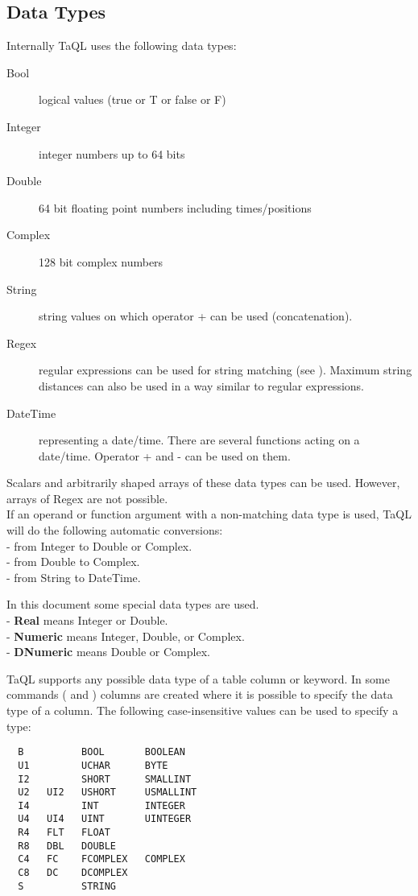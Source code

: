 \subsection{\label{TAQL:DATATYPES}Data Types}
Internally TaQL uses the following data types:
\begin{description}
  \item[Bool ] logical values (true or T or false or F)
  \item[Integer ] integer numbers up to 64 bits
  \item[Double ] 64 bit floating point numbers including times/positions
  \item[Complex ] 128 bit complex numbers
  \item[String ] string values on which operator + can be used (concatenation).
  \item[Regex ] regular expressions can be used for string
    matching (see ). Maximum string
    distances can also be used in a way similar to regular
    expressions. 
  \item[DateTime ] representing a date/time. There are several functions
       acting on a date/time. Operator + and - can be used on them.
\end{description}
Scalars and arbitrarily shaped arrays of these data types can be used.
However, arrays of Regex are not possible.
\\If an operand or function argument with a non-matching data type
is used, TaQL will do the following automatic conversions:
\\- from Integer to Double or Complex.
\\- from Double to Complex.
\\- from String to DateTime.

In this document some special data types are used.
\\- \textbf{Real} means Integer or Double.
\\- \textbf{Numeric} means Integer, Double, or Complex.
\\- \textbf{DNumeric} means Double or Complex.

\label{TAQL:DATATYPESTRING}
TaQL supports any possible data type of a table column or keyword.
In some commands ( and
) columns are created where
it is possible to specify the data type of a column. 
The following case-insensitive values can be used to specify a type:
\begin{verbatim}
  B          BOOL       BOOLEAN
  U1         UCHAR      BYTE
  I2         SHORT      SMALLINT
  U2   UI2   USHORT     USMALLINT
  I4         INT        INTEGER
  U4   UI4   UINT       UINTEGER
  R4   FLT   FLOAT
  R8   DBL   DOUBLE
  C4   FC    FCOMPLEX   COMPLEX
  C8   DC    DCOMPLEX
  S          STRING
\end{verbatim}

